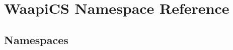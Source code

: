 \hypertarget{namespace_waapi_c_s}{}\section{Waapi\+CS Namespace Reference}
\label{namespace_waapi_c_s}
\subsection*{Namespaces}
\begin{DoxyCompactItemize}
\end{DoxyCompactItemize}
